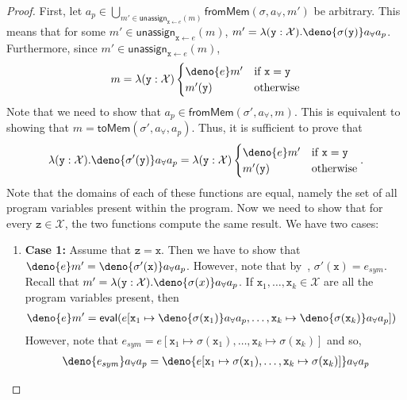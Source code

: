 \documentclass[acmsmall,review,anonymous]{acmart}\settopmatter{printfolios=true,printccs=false,printacmref=false}
\begin{document}
\begin{proof}
  First, let $a_p \in \bigcup_{m' \in \mathsf{unassign}_{\mathtt{x}\gets e}(m)} \mathsf{fromMem}(\sigma,a_{\forall},m')$ be arbitrary. This means that for some $m' \in \mathsf{unassign}_{\mathtt{x}\gets e}(m)$, $m' = \lambda (\mathtt{y} : \mathcal{X}) . \deno{\sigma(\mathtt{y})}a_{\forall}a_p$. Furthermore, since $m' \in \mathsf{unassign}_{\mathtt{x}\gets e}(m)$,
  \[
    m = \lambda (\mathtt{y} : \mathcal{X})
    \begin{cases}
      \deno{e}m' & \text{if $\mathtt{x}=\mathtt{y}$}\\
      m'(\mathtt{y}) & \text{otherwise}
    \end{cases}
  \]
  Note that we need to show that $a_p \in \mathsf{fromMem}(\sigma',a_{\forall},m)$. This is equivalent to showing that $m =\mathsf{toMem}(\sigma',a_{\forall},a_p)$. Thus, it is sufficient to prove that
  \[
    \lambda (\mathtt{y} : \mathcal{X}) . \deno{\sigma'(\mathtt{y})}a_{\forall}a_p = \lambda (\mathtt{y} : \mathcal{X})
    \begin{cases}
      \deno{e}m' & \text{if $\mathtt{x}=\mathtt{y}$}\\
      m'(\mathtt{y}) & \text{otherwise}
    \end{cases}.
  \]
  Note that the domains of each of these functions are equal, namely the set of all program variables present within the program. Now we need to show that for every $\mathtt{z} \in \mathcal{X}$, the two functions compute the same result. We have two cases:
  \begin{enumerate}
  \item \textbf{Case 1:} Assume that $\mathtt{z} = \mathtt{x}$. Then we have to show that $\deno{e}m' = \deno{\sigma'(\mathtt{x})}a_{\forall}a_p$. However, note that by~, $\sigma'(\mathtt{x}) = e_{sym}$. Recall that $m' = \lambda (\mathtt{y} : \mathcal{X}) . \deno{\sigma(x)}a_{\forall}a_p$. If $\mathtt{x}_1,\ldots,\mathtt{x}_k \in \mathcal{X}$ are all the program variables present, then
    \begin{align*}
      \deno{e}m' &= \mathsf{eval}(e[\mathtt{x}_1 \mapsto \deno{\sigma(\mathtt{x}_1)}a_{\forall}a_p, \ldots, \mathtt{x}_k \mapsto \deno{\sigma(\mathtt{x}_k)}a_{\forall}a_p])
    \end{align*}
    However, note that $e_{sym} = e[\mathtt{x}_1 \mapsto \sigma(\mathtt{x}_1),\ldots,\mathtt{x}_k \mapsto \sigma(\mathtt{x}_k)]$ and so,
    \begin{align*}
      \deno{e_{sym}}a_{\forall}a_p &= \deno{e[\mathtt{x}_1 \mapsto \sigma(\mathtt{x}_1),\ldots,\mathtt{x}_k \mapsto \sigma(\mathtt{x}_k)]}a_{\forall}a_p\\

\end{align*}
\end{enumerate}
\end{proof}
\end{document}
